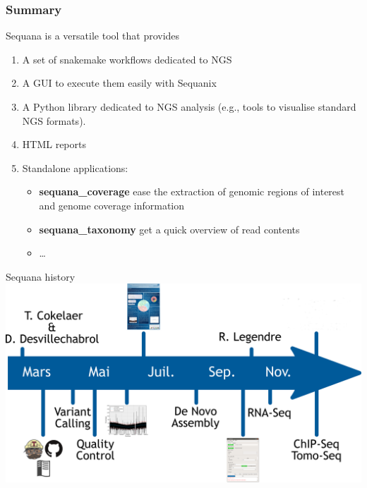 \documentclass{beamer}
\begin{document}
\begin{frame}
 \frametitle{Summary}
Sequana is a versatile tool that provides

\begin{enumerate}
 \item A set of snakemake workflows dedicated to NGS 
 \item A GUI to execute them easily with Sequanix
 \item A Python library dedicated to NGS analysis (e.g., tools to visualise standard NGS formats).
 \item HTML reports
 \item Standalone applications:
 \begin{itemize}
    \item \textbf{sequana\_coverage} ease the extraction of genomic regions of interest and genome coverage information
    \item \textbf{sequana\_taxonomy} get a quick overview of read contents
    \item \dots
 \end{itemize}
\end{enumerate}
\end{frame}

\begin{frame}{Sequana history}
    \includegraphics[scale=0.2]{images/timeline}
\end{frame}
\end{document}
